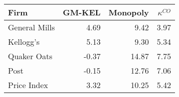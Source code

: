 \centering
\begin{tabular}{l r r r}
\toprule
Firm & GM-KEL & Monopoly & $\kappa^{CO}$\\
\midrule
General Mills&4.69&9.42&3.97\\
Kellogg's&5.13&9.30&5.34\\
Quaker Oats&-0.37&14.87&7.75\\
Post&-0.15&12.76&7.06\\
\midrule
Price Index&3.32&10.25&5.42 \\
\bottomrule
\end{tabular}
